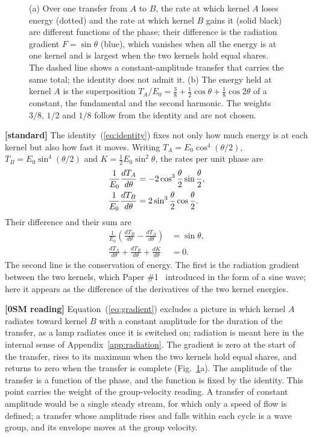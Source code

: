 \documentclass[%
 reprint, amsmath,amssymb, aps, prb, ]{revtex4-2}
\numberwithin{equation}{section}
\begin{document}
\begin{figure}[t!]
\label{fig:envelope}
\vspace{0.4em}
\begin{minipage}{0.95\textwidth}
\justifying\small
(a) Over one transfer from $A$ to $B$, the rate at which kernel $A$ loses energy (dotted) and the rate at which kernel $B$ gains it (solid black) are different functions of the phase; their difference is the radiation gradient $F = \sin\theta$ (blue), which vanishes when all the energy is at one kernel and is largest when the two kernels hold equal shares. The dashed line shows a constant-amplitude transfer that carries the same total; the identity does not admit it. (b) The energy held at kernel $A$ is the superposition $T_A/E_0 = \tfrac38 + \tfrac12\cos\theta + \tfrac18\cos2\theta$ of a constant, the fundamental and the second harmonic. The weights $3/8$, $1/2$ and $1/8$ follow from the identity and are not chosen.
\end{minipage}
\end{figure}

\textbf{[standard]} The identity~(\ref{eq:identity}) fixes not only how much energy is at each kernel but also how fast it moves. Writing $T_A = E_0\cos^4(\theta/2)$, $T_B = E_0\sin^4(\theta/2)$ and $K = \tfrac12E_0\sin^2\theta$, the rates per unit phase are
\begin{align}
\frac{1}{E_0}\frac{dT_A}{d\theta} &= -2\cos^3\frac{\theta}{2}\sin\frac{\theta}{2},
\notag\\
\frac{1}{E_0}\frac{dT_B}{d\theta} &= 2\sin^3\frac{\theta}{2}\cos\frac{\theta}{2}.
\label{eq:rates}
\end{align}
Their difference and their sum are
\begin{align}
\frac{1}{E_0}\left(\frac{dT_B}{d\theta} - \frac{dT_A}{d\theta}\right) &= \sin\theta,
\label{eq:gradient}\\
\frac{dT_A}{d\theta} + \frac{dT_B}{d\theta} + \frac{dK}{d\theta} &= 0.
\label{eq:conservation}
\end{align}
The second line is the conservation of energy. The first is the radiation gradient between the two kernels, which Paper \#1~\cite{H01} introduced in the form of a sine wave; here it appears as the difference of the derivatives of the two kernel energies.

\textbf{[0SM reading]} Equation~(\ref{eq:gradient}) excludes a picture in which kernel $A$ radiates toward kernel $B$ with a constant amplitude for the duration of the transfer, as a lamp radiates once it is switched on; radiation is meant here in the internal sense of Appendix~\ref{app:radiation}. The gradient is zero at the start of the transfer, rises to its maximum when the two kernels hold equal shares, and returns to zero when the transfer is complete (Fig.~\ref{fig:envelope}a). The amplitude of the transfer is a function of the phase, and the function is fixed by the identity. This point carries the weight of the group-velocity reading. A transfer of constant amplitude would be a single steady stream, for which only a speed of flow is defined; a transfer whose amplitude rises and falls within each cycle is a wave group, and its envelope moves at the group velocity.
\end{document}
